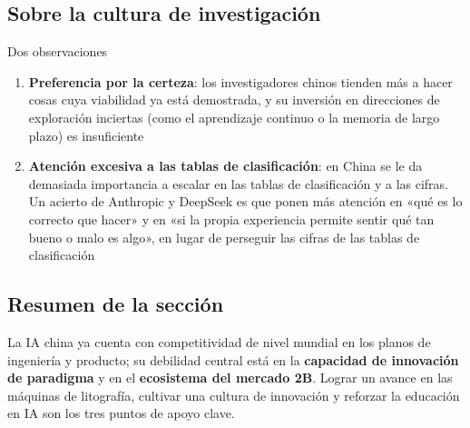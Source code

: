 \subsection{Sobre la cultura de investigación}

\begin{knowledgebox}{Dos observaciones}
\begin{enumerate}
\item \textbf{Preferencia por la certeza}: los investigadores chinos tienden más a hacer cosas cuya viabilidad ya está demostrada, y su inversión en direcciones de exploración inciertas (como el aprendizaje continuo o la memoria de largo plazo) es insuficiente
\item \textbf{Atención excesiva a las tablas de clasificación}: en China se le da demasiada importancia a escalar en las tablas de clasificación y a las cifras. Un acierto de Anthropic y DeepSeek es que ponen más atención en «qué es lo correcto que hacer» y en «si la propia experiencia permite sentir qué tan bueno o malo es algo», en lugar de perseguir las cifras de las tablas de clasificación
\end{enumerate}
\end{knowledgebox}

\subsection{Resumen de la sección}

La IA china ya cuenta con competitividad de nivel mundial en los planos de ingeniería y producto; su debilidad central está en la \textbf{capacidad de innovación de paradigma} y en el \textbf{ecosistema del mercado 2B}. Lograr un avance en las máquinas de litografía, cultivar una cultura de innovación y reforzar la educación en IA son los tres puntos de apoyo clave.

